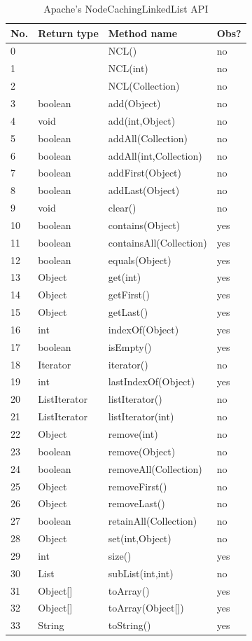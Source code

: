 \begin{table}[H]
\center
{\scriptsize
\begin{tabular}{|l|l|l|l|}
\hline
No. &Return type & Method name & Obs? \\
\hline
    0 && NCL() & no \\
    1& & NCL(int) & no \\
    2&& NCL(Collection) & no \\
    3&boolean & add(Object) & no \\
    4&void&add(int,Object) & no \\
    5&boolean&addAll(Collection) & no\\
    6&boolean&addAll(int,Collection) & no \\
    7&boolean&addFirst(Object) & no \\
    8&boolean&addLast(Object) & no\\
    9&void&clear() & no\\
    10&boolean&contains(Object) & yes \\
    11&boolean&containsAll(Collection) & yes \\
    12&boolean&equals(Object) & yes \\
    13&Object&get(int) & yes\\
    14&Object&getFirst() &yes \\
    15&Object&getLast() & yes\\
    16&int&indexOf(Object) &yes\\
    17&boolean&isEmpty() & yes\\
    18&Iterator&iterator() & no\\
    19&int&lastIndexOf(Object) &yes \\
    20&ListIterator&listIterator() &no \\
    21&ListIterator&listIterator(int) & no\\
    22&Object&remove(int) &no\\
    23&boolean&remove(Object) & no \\
    24&boolean&removeAll(Collection) & no \\
    25&Object&removeFirst() &no\\
    26&Object&removeLast() &no\\
    27&boolean&retainAll(Collection) &no \\
    28&Object&set(int,Object) &no\\
    29&int&size() &yes\\
    30&List&subList(int,int) & no \\
    31&Object[]&toArray() & yes \\
    32&Object[]&toArray(Object[]) &yes\\
    33&String&toString() & yes \\
\hline
\end{tabular}
}
\caption{Apache's NodeCachingLinkedList API}
\label{tab:ncl-api}
\end{table} 
